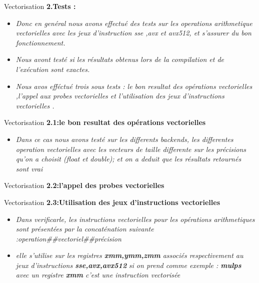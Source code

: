 \documentclass{beamer}
\begin{document}
\begin{frame}{Vectorisation}
\textbf{2.Tests :}
  \begin{itemize}
        \item\textit{Donc en genéral nous avons effectué des tests sur les operations arithmetique vectorielles avec les jeux d'instruction sse ,avx et avx512, et s'assurer du bon fonctionnement. } 
         \item\textit{Nous avont testé si les résultats obtenus lors de la compilation et de l’exécution sont exactes.} 
        
         \item \textit{Nous avos efféctué trois sous tests : le bon resultat des opérations vectorielles ,l'appel aux probes vectorielles et l'utilisation des jeux d'instructions vectorielles .}  
         
         \end{itemize}
         \end{frame}
\begin{frame}{Vectorisation}         
\textbf{2.1:le bon resultat des opérations vectorielles}
  \begin{itemize}
        \item\textit{Dans ce cas nous avons testé sur les differents backends, les differentes operation vectorielles avec les vecteurs de taille differente sur les précisions qu'on a choisit (float et double);
        et on a deduit que les résultats retournés sont vrai
        } 
        \end{itemize}
\end{frame}

\begin{frame}{Vectorisation}         
\textbf{2.2:l'appel des probes vectorielles}
        
\end{frame}

\begin{frame}{Vectorisation}         
\textbf{2.3:Utilisation des jeux d’instructions vectorielles}
  \begin{itemize}
     \item\textit{Dans verificarle, les instructions vectorielles pour les opérations arithmetiques sont présentées par la concaténation suivante :operation##vectoriel##précision } 
      \item\textit{elle s'utilise sur les registres \textbf{xmm,ymm,zmm } associés respectivement au jeux d'instructions \textbf{sse,avx,avx512} } 
      \textit{si on prend comme exemple : \textbf{mulps} avec un registre \textbf{xmm} c'est une instruction vectorisée} 
   \end{itemize}
\end{frame}
\end{document}
